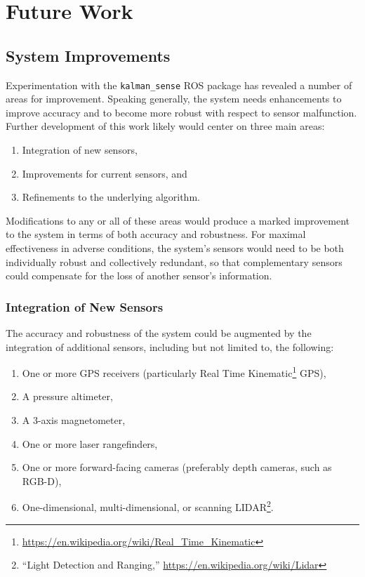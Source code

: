 \chapter{Future Work}

\section{System Improvements}

Experimentation with the \texttt{kalman\_sense} ROS package has revealed a number of areas for improvement. Speaking generally, the system needs enhancements to improve accuracy and to become more robust with respect to sensor malfunction. Further development of this work likely would center on three main areas:
\begin{enumerate}
    \item Integration of new sensors,
    \item Improvements for current sensors, and
    \item Refinements to the underlying algorithm.
\end{enumerate}
Modifications to any or all of these areas would produce a marked improvement to the system in terms of both accuracy and robustness. For maximal effectiveness in adverse conditions, the system's sensors would need to be both individually robust and collectively redundant, so that complementary sensors could compensate for the loss of another sensor's information.

\subsection{Integration of New Sensors}
The accuracy and robustness of the system could be augmented by the integration of additional sensors, including but not limited to, the following:
\begin{enumerate}
    \item One or more GPS receivers (particularly Real Time Kinematic\footnote{\url{https://en.wikipedia.org/wiki/Real_Time_Kinematic}} GPS),
    \item A pressure altimeter,
    \item A 3-axis magnetometer,
    \item One or more laser rangefinders,
    \item One or more forward-facing cameras (preferably depth cameras, such as RGB-D),
    \item One-dimensional, multi-dimensional, or scanning LIDAR\footnote{``Light Detection and Ranging,'' \url{https://en.wikipedia.org/wiki/Lidar}}.
\end{enumerate}

